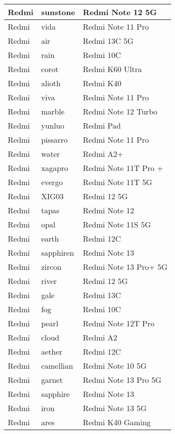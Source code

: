 \begin{tabularx}{\linewidth}{|l|X|X|}
        Redmi & sunstone & Redmi Note 12 5G \\ \hline
        Redmi & vida & Redmi Note 11 Pro \\ \hline
        Redmi & air & Redmi 13C 5G \\ \hline
        Redmi & rain & Redmi 10C \\ \hline
        Redmi & corot & Redmi K60 Ultra \\ \hline
        Redmi & alioth & Redmi K40 \\ \hline
        Redmi & viva & Redmi Note 11 Pro \\ \hline
        Redmi & marble & Redmi Note 12 Turbo \\ \hline
        Redmi & yunluo & Redmi Pad \\ \hline
        Redmi & pissarro & Redmi Note 11 Pro \\ \hline
        Redmi & water & Redmi A2+ \\ \hline
        Redmi & xagapro & Redmi Note 11T Pro + \\ \hline
        Redmi & evergo & Redmi Note 11T 5G \\ \hline
        Redmi & XIG03 & Redmi 12 5G \\ \hline
        Redmi & tapas & Redmi Note 12 \\ \hline
        Redmi & opal & Redmi Note 11S 5G \\ \hline
        Redmi & earth & Redmi 12C \\ \hline
        Redmi & sapphiren & Redmi Note 13 \\ \hline
        Redmi & zircon & Redmi Note 13 Pro+ 5G \\ \hline
        Redmi & river & Redmi 12 5G \\ \hline
        Redmi & gale & Redmi 13C \\ \hline
        Redmi & fog & Redmi 10C \\ \hline
        Redmi & pearl & Redmi Note 12T Pro \\ \hline
        Redmi & cloud & Redmi A2 \\ \hline
        Redmi & aether & Redmi 12C \\ \hline
        Redmi & camellian & Redmi Note 10 5G \\ \hline
        Redmi & garnet & Redmi Note 13 Pro 5G \\ \hline
        Redmi & sapphire & Redmi Note 13 \\ \hline
        Redmi & iron & Redmi Note 13 5G \\ \hline
        Redmi & ares & Redmi K40 Gaming \\ \hline

\end{tabularx}
